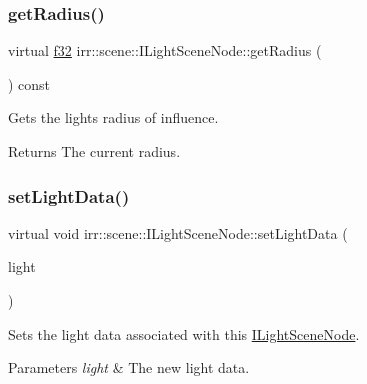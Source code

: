 \subsubsection{\texorpdfstring{get\+Radius()}{getRadius()}\hspace{0.1cm}{\footnotesize\ttfamily [2/2]}}
{\footnotesize\ttfamily virtual \hyperlink{namespaceirr_a0277be98d67dc26ff93b1a6a1d086b07}{f32} irr\+::scene\+::\+I\+Light\+Scene\+Node\+::get\+Radius (\begin{DoxyParamCaption}{ }\end{DoxyParamCaption}) const\hspace{0.3cm}{\ttfamily [pure virtual]}}



Gets the light\textquotesingle{}s radius of influence. 

\begin{DoxyReturn}{Returns}
The current radius. 
\end{DoxyReturn}
\mbox{\label{classirr_1_1scene_1_1ILightSceneNode_acf74ff3400a26ae31eb96b9c479e62d5}} 
\subsubsection{\texorpdfstring{set\+Light\+Data()}{setLightData()}\hspace{0.1cm}{\footnotesize\ttfamily [1/2]}}
{\footnotesize\ttfamily virtual void irr\+::scene\+::\+I\+Light\+Scene\+Node\+::set\+Light\+Data (\begin{DoxyParamCaption}\item[{const \hyperlink{structirr_1_1video_1_1SLight}{video\+::\+S\+Light} \&}]{light }\end{DoxyParamCaption})\hspace{0.3cm}{\ttfamily [pure virtual]}}



Sets the light data associated with this \hyperlink{classirr_1_1scene_1_1ILightSceneNode}{I\+Light\+Scene\+Node}. 


\begin{DoxyParams}{Parameters}
{\em light} & The new light data. \\
\hline
\end{DoxyParams}
\mbox{\label{classirr_1_1scene_1_1ILightSceneNode_acf74ff3400a26ae31eb96b9c479e62d5}} 

